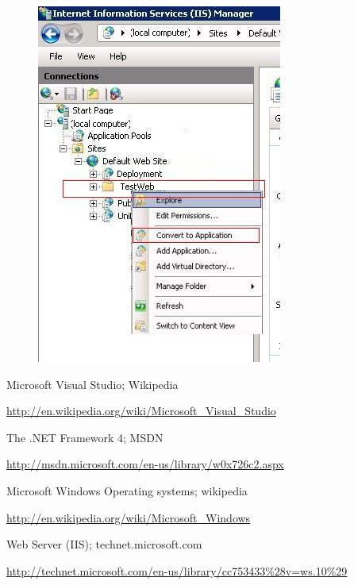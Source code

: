 \documentclass[a4paper,12pt]{article}
\begin{document}
\begin{center}
	\begin{figure}
		\includegraphics{ConvertToApplication.JPG}
			\caption{}
			\label{fig2}    
	\end{figure}	
\end{center}

\clearpage
\begin{thebibliography}{5}

 \begin{flushleft}
Microsoft Visual Studio; Wikipedia
\end{flushleft} \url{http://en.wikipedia.org/wiki/Microsoft_Visual_Studio}

\begin{flushleft}
 The .NET Framework 4; MSDN 
\end{flushleft}\url{http://msdn.microsoft.com/en-us/library/w0x726c2.aspx}

\begin{flushleft}
 Microsoft Windows Operating systems; wikipedia
\end{flushleft} \url{http://en.wikipedia.org/wiki/Microsoft_Windows}

 \begin{flushleft}
Web Server (IIS); technet.microsoft.com 
\end{flushleft}\url{http://technet.microsoft.com/en-us/library/cc753433%28v=ws.10%29}

\end{thebibliography}


 
\end{document}
